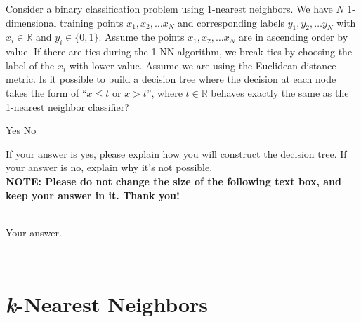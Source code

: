 \documentclass[11pt,addpoints,answers]{exam}
\numberwithin{equation}{section} %
\numberwithin{figure}{section} %
\numberwithin{table}{section} %
\begin{document}
\begin{questions}
\begin{parts}
    \end{parts}
    
    \question[2] Consider a binary classification problem using $1$-nearest neighbors. We have $N$ 1-dimensional training points $x_1, x_2, \ldots x_N$ and corresponding labels $y_1, y_2, \ldots y_N$ with $x_i \in \mathbb{R}$ and $y_i \in \{0, 1\}$. Assume the points $x_1, x_2, \ldots x_N$ are in ascending order by value. If there are ties during the 1-NN algorithm, we break ties by choosing the label of the $x_i$ with lower value. Assume we are using the Euclidean distance metric. Is it possible to build a decision tree where the decision at each node takes the form of “$x \leq t$ or $x > t$”, where $t \in \mathbb{R}$ behaves exactly the same as the 1-nearest neighbor classifier?
    
    \begin{checkboxes}
        \choice Yes
        \choice No
    \end{checkboxes}
     If your answer is yes, please explain how you will construct the decision tree. If your answer is no, explain why it’s not possible.  \\
   
    \textbf{NOTE: Please do not change the size of the following text box, and keep your answer in it. Thank you!} \\ \\
    \begin{tcolorbox}[fit,height=4cm, width=15cm, blank, borderline={1pt}{-2pt},nobeforeafter, top=2pt, left=2pt, right=2pt, bottom=2pt]
    \large
    Your answer.

    \end{tcolorbox} \\
    
    

    

\end{questions}


\newpage
\section{{\it k}-Nearest Neighbors}
\end{document}
